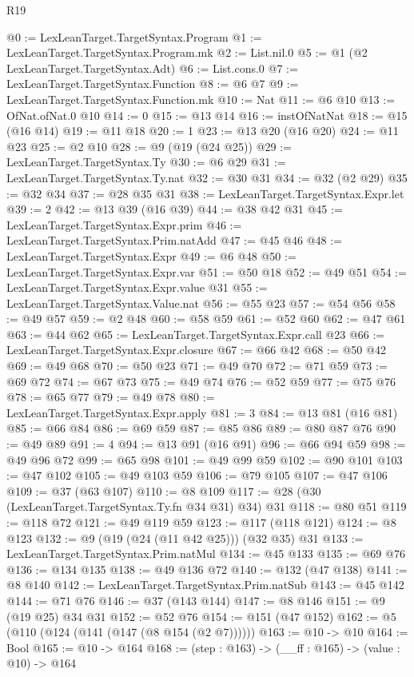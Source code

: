 \begin{lexlean}{R19}
\begin{coremodule}
@0 := LexLeanTarget.TargetSyntax.Program
@1 := LexLeanTarget.TargetSyntax.Program.mk
@2 := List.nil.{0}
@5 := @1 (@2 LexLeanTarget.TargetSyntax.Adt)
@6 := List.cons.{0}
@7 := LexLeanTarget.TargetSyntax.Function
@8 := @6 @7
@9 := LexLeanTarget.TargetSyntax.Function.mk
@10 := Nat
@11 := @6 @10
@13 := OfNat.ofNat.{0} @10
@14 := 0
@15 := @13 @14
@16 := instOfNatNat
@18 := @15 (@16 @14)
@19 := @11 @18
@20 := 1
@23 := @13 @20 (@16 @20)
@24 := @11 @23
@25 := @2 @10
@28 := @9 (@19 (@24 @25))
@29 := LexLeanTarget.TargetSyntax.Ty
@30 := @6 @29
@31 := LexLeanTarget.TargetSyntax.Ty.nat
@32 := @30 @31
@34 := @32 (@2 @29)
@35 := @32 @34
@37 := @28 @35 @31
@38 := LexLeanTarget.TargetSyntax.Expr.let
@39 := 2
@42 := @13 @39 (@16 @39)
@44 := @38 @42 @31
@45 := LexLeanTarget.TargetSyntax.Expr.prim
@46 := LexLeanTarget.TargetSyntax.Prim.natAdd
@47 := @45 @46
@48 := LexLeanTarget.TargetSyntax.Expr
@49 := @6 @48
@50 := LexLeanTarget.TargetSyntax.Expr.var
@51 := @50 @18
@52 := @49 @51
@54 := LexLeanTarget.TargetSyntax.Expr.value @31
@55 := LexLeanTarget.TargetSyntax.Value.nat
@56 := @55 @23
@57 := @54 @56
@58 := @49 @57
@59 := @2 @48
@60 := @58 @59
@61 := @52 @60
@62 := @47 @61
@63 := @44 @62
@65 := LexLeanTarget.TargetSyntax.Expr.call @23
@66 := LexLeanTarget.TargetSyntax.Expr.closure
@67 := @66 @42
@68 := @50 @42
@69 := @49 @68
@70 := @50 @23
@71 := @49 @70
@72 := @71 @59
@73 := @69 @72
@74 := @67 @73
@75 := @49 @74
@76 := @52 @59
@77 := @75 @76
@78 := @65 @77
@79 := @49 @78
@80 := LexLeanTarget.TargetSyntax.Expr.apply
@81 := 3
@84 := @13 @81 (@16 @81)
@85 := @66 @84
@86 := @69 @59
@87 := @85 @86
@89 := @80 @87 @76
@90 := @49 @89
@91 := 4
@94 := @13 @91 (@16 @91)
@96 := @66 @94 @59
@98 := @49 @96 @72
@99 := @65 @98
@101 := @49 @99 @59
@102 := @90 @101
@103 := @47 @102
@105 := @49 @103 @59
@106 := @79 @105
@107 := @47 @106
@109 := @37 (@63 @107)
@110 := @8 @109
@117 := @28 (@30 (LexLeanTarget.TargetSyntax.Ty.fn @34 @31) @34) @31
@118 := @80 @51
@119 := @118 @72
@121 := @49 @119 @59
@123 := @117 (@118 @121)
@124 := @8 @123
@132 := @9 (@19 (@24 (@11 @42 @25))) (@32 @35) @31
@133 := LexLeanTarget.TargetSyntax.Prim.natMul
@134 := @45 @133
@135 := @69 @76
@136 := @134 @135
@138 := @49 @136 @72
@140 := @132 (@47 @138)
@141 := @8 @140
@142 := LexLeanTarget.TargetSyntax.Prim.natSub
@143 := @45 @142
@144 := @71 @76
@146 := @37 (@143 @144)
@147 := @8 @146
@151 := @9 (@19 @25) @34 @31
@152 := @52 @76
@154 := @151 (@47 @152)
@162 := @5 (@110 (@124 (@141 (@147 (@8 @154 (@2 @7))))))
@163 := @10 -> @10
@164 := Bool
@165 := @10 -> @164
@168 := (step : @163) -> (__ff : @165) -> (value : @10) -> @164

\end{coremodule}
\end{lexlean}
